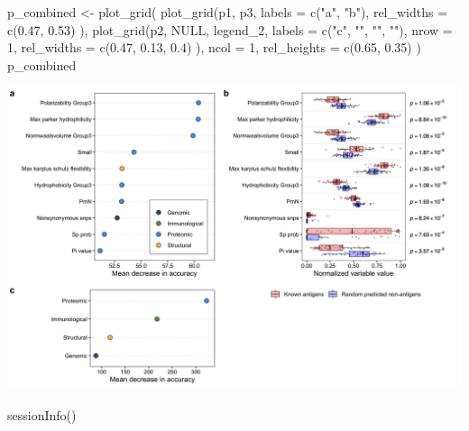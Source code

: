 \documentclass[
  11pt,
  oneside]{book}
\newenvironment{Shaded}{\begin{snugshade}}{\end{snugshade}}
\newcommand{\AttributeTok}[1]{\textcolor[rgb]{0.77,0.63,0.00}{#1}}
\newcommand{\ConstantTok}[1]{\textcolor[rgb]{0.00,0.00,0.00}{#1}}
\newcommand{\DecValTok}[1]{\textcolor[rgb]{0.00,0.00,0.81}{#1}}
\newcommand{\FloatTok}[1]{\textcolor[rgb]{0.00,0.00,0.81}{#1}}
\newcommand{\FunctionTok}[1]{\textcolor[rgb]{0.00,0.00,0.00}{#1}}
\newcommand{\NormalTok}[1]{#1}
\newcommand{\OtherTok}[1]{\textcolor[rgb]{0.56,0.35,0.01}{#1}}
\newcommand{\StringTok}[1]{\textcolor[rgb]{0.31,0.60,0.02}{#1}}
\begin{document}
\begin{Shaded}
\begin{Highlighting}[]
\NormalTok{p\_combined }\OtherTok{\textless{}{-}} \FunctionTok{plot\_grid}\NormalTok{(}
  \FunctionTok{plot\_grid}\NormalTok{(p1, p3,}
    \AttributeTok{labels =} \FunctionTok{c}\NormalTok{(}\StringTok{"a"}\NormalTok{, }\StringTok{"b"}\NormalTok{),}
    \AttributeTok{rel\_widths =} \FunctionTok{c}\NormalTok{(}\FloatTok{0.47}\NormalTok{, }\FloatTok{0.53}\NormalTok{)}
\NormalTok{  ),}
  \FunctionTok{plot\_grid}\NormalTok{(p2, }\ConstantTok{NULL}\NormalTok{, legend\_2,}
    \AttributeTok{labels =} \FunctionTok{c}\NormalTok{(}\StringTok{"c"}\NormalTok{, }\StringTok{""}\NormalTok{, }\StringTok{""}\NormalTok{, }\StringTok{""}\NormalTok{), }\AttributeTok{nrow =} \DecValTok{1}\NormalTok{,}
    \AttributeTok{rel\_widths =} \FunctionTok{c}\NormalTok{(}\FloatTok{0.47}\NormalTok{, }\FloatTok{0.13}\NormalTok{, }\FloatTok{0.4}\NormalTok{)}
\NormalTok{  ),}
  \AttributeTok{ncol =} \DecValTok{1}\NormalTok{, }\AttributeTok{rel\_heights =} \FunctionTok{c}\NormalTok{(}\FloatTok{0.65}\NormalTok{, }\FloatTok{0.35}\NormalTok{)}
\NormalTok{)}
\NormalTok{p\_combined}
\end{Highlighting}
\end{Shaded}

\begin{center}\includegraphics[width=1\linewidth]{./figures/Fig 3} \end{center}

\begin{Shaded}
\begin{Highlighting}[]
\FunctionTok{sessionInfo}\NormalTok{()}
\end{Highlighting}
\end{Shaded}
\end{document}
